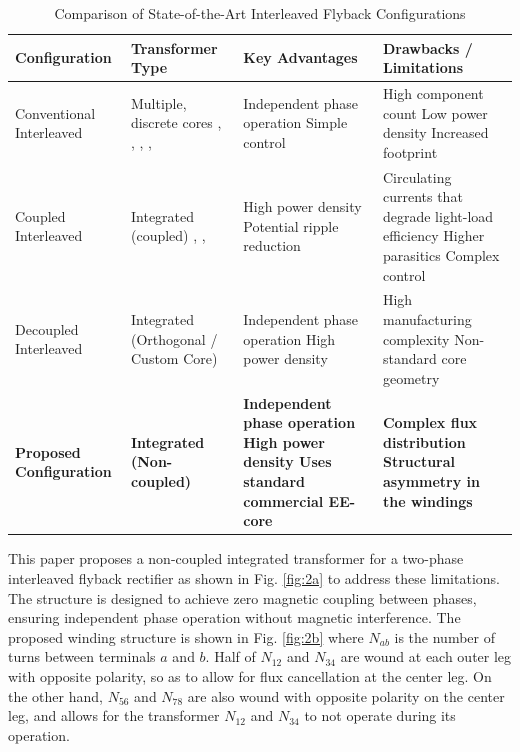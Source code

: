 \documentclass[lettersize,journal]{IEEEtran}
\begin{document}
\begin{table}[b!]
    \caption{Comparison of State-of-the-Art Interleaved Flyback Configurations}
    \renewcommand{\arraystretch}{1.5}
    \centering
    \footnotesize
    \begin{tabular}{l m{4cm} m{4.5cm} m{4.5cm}}
        \hline
        \textbf{Configuration} & \textbf{Transformer Type} & \textbf{Key Advantages} & \textbf{Drawbacks / Limitations} \\
        \hline \hline
        Conventional Interleaved & Multiple, discrete cores \cite{shi2024}, \cite{cheng2018}, \cite{wu2015}, \cite{cheng2023}, \cite{mayer2025} & Independent phase operation \newline Simple control & High component count \newline Low power density \newline Increased footprint \\
        Coupled Interleaved & Integrated (coupled) \cite{ishihara2015}, \cite{tonolo2025}, \cite{qian2008} & High power density \newline Potential ripple reduction & Circulating currents that degrade light-load efficiency \cite{Yang_2020, Z_Li_2025} \newline Higher parasitics \cite{meng2021, kwon2024} \newline Complex control \cite{Mao_2011} \\
        Decoupled Interleaved & Integrated (Orthogonal / Custom Core) \cite{Z_Li_2025, Ouyang, fayyaz2025} & Independent phase operation \newline High power density & High manufacturing complexity \newline Non-standard core geometry \\
        \textbf{Proposed Configuration} & \textbf{Integrated (Non-coupled)} & \textbf{Independent phase operation \newline High power density \newline Uses standard commercial EE-core} & \textbf{Complex flux distribution \newline Structural asymmetry in the windings} \\
        \hline
    \end{tabular}
    \label{tab:literature_comparison}
\end{table}

This paper proposes a non-coupled integrated transformer for a two-phase interleaved flyback rectifier as shown in Fig. \ref{fig:2a} to address these limitations. The structure is designed to achieve zero magnetic coupling between phases, ensuring independent phase operation without magnetic interference. The proposed winding structure is shown in Fig. \ref{fig:2b} where $N_{ab}$ is the number of turns between terminals $a$ and $b$. Half of $N_{12}$ and $N_{34}$ are wound at each outer leg with opposite polarity, so as to allow for flux cancellation at the center leg. On the other hand, $N_{56}$ and $N_{78}$ are also wound with opposite polarity on the center leg, and allows for the transformer $N_{12}$ and $N_{34}$ to not operate during its operation. 
\end{document}
